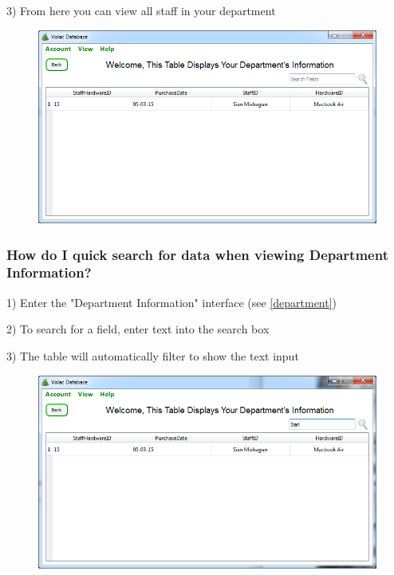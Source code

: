 3) From here you can view all staff in your department

\begin{figure}[H]
    \includegraphics[width=\textwidth]{./Manual/Images/department1.png}
\end{figure}

\subsubsection{How do I quick search for data when viewing Department Information?}\label{departquicksearch}

1) Enter the "Department Information" interface (see \ref{department})

2) To search for a field, enter text into the search box 

3) The table will automatically filter to show the text input

\begin{figure}[H]
    \includegraphics[width=\textwidth]{./Manual/Images/quicksearchdept.png}
\end{figure}

